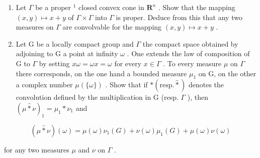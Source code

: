 \exercisesection{}

\begin{enumerate}
\def\labelenumi{\arabic{enumi})}
\item
  Let \(\Gamma\) be a proper \(^{1}\) closed convex cone in \(\mathbf{R}^{n}\) . Show that the mapping \((x,y)\mapsto x+y\) of \(\Gamma\times\Gamma\) into \(\Gamma\) is proper. Deduce from this that any two measures on \(\Gamma\) are convolvable for the mapping \((x,y)\mapsto x+y\) .
\item
  Let G be a locally compact group and \(\Gamma\) the compact space obtained by adjoining to G a point at infinity \(\omega\) . One extends the law of composition of G to \(\Gamma\) by setting \(x\omega = \omega x = \omega\) for every \(x \in \Gamma\) . To every measure \(\mu\) on \(\Gamma\) there corresponds, on the one hand a bounded measure \(\mu_{1}\) on G, on the other a complex number \(\mu(\{\omega\})\) . Show that if \(*(\text{resp.}\widehat{*})\) denotes the convolution defined by the multiplication in G (resp. \(\Gamma\) ), then \((\mu\widehat{*}\nu)_{1} = \mu_{1}*\nu_{1}\) and
\end{enumerate}

\[
(\mu \widehat {*} \nu) (\omega) = \mu (\omega) \nu_ {1} (G) + \nu (\omega) \mu_ {1} (G) + \mu (\omega) \nu (\omega)
\]

for any two measures \(\mu\) and \(\nu\) on \(\Gamma\) .

